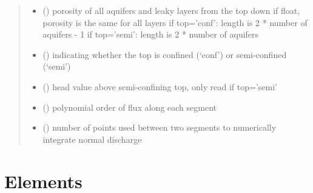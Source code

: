 \documentclass[letterpaper,10pt,english]{sphinxmanual}
\begin{document}
\begin{fulllineitems}
\begin{quote}
\begin{description}
\begin{itemize}
\item {} 
 (\sphinxstyleliteralemphasis{, }) \textendash{} porosity of all aquifers and leaky layers from the top down
if float, porosity is the same for all layers
if top=’conf’: length is 2 * number of aquifers - 1
if top=’semi’: length is 2 * number of aquifers

\item {} 
 (\sphinxstyleliteralemphasis{, }\sphinxstyleliteralemphasis{ (}\sphinxstyleliteralemphasis{)}) \textendash{} indicating whether the top is confined (‘conf’) or
semi-confined (‘semi’)

\item {} 
 (\sphinxstyleliteralemphasis{ (}\sphinxstyleliteralemphasis{)}) \textendash{} head value above semi-confining top, only read if top=’semi’

\item {} 
 () \textendash{} polynomial order of flux along each segment

\item {} 
 () \textendash{} number of points used between two segments to numerically
integrate normal discharge

\end{itemize}

\end{description}\end{quote}

\end{fulllineitems}



\section{Elements}
\label{\detokenize{aems:elements}}\label{\detokenize{aems::doc}}
\end{document}
